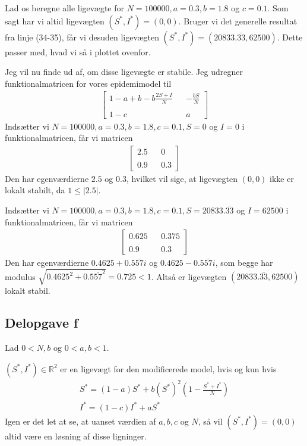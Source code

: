 \documentclass[12pt]{article}
\begin{document}
Lad os beregne alle ligevægte for $N=100000, a=0.3, b=1.8$ og $c=0.1$. Som sagt har vi altid ligevægten $(S^*, I^*)=(0,0)$. Bruger vi det generelle resultat fra linje (34-35), får vi desuden ligevægten $(S^*, I^*)=(20833.\overline{33},62500)$. Dette passer med, hvad vi så i plottet ovenfor.

Jeg vil nu finde ud af, om disse ligevægte er stabile. Jeg udregner funktionalmatricen for vores epidemimodel til
\begin{align}
\begin{bmatrix}
1 - a + b - b\frac{2S + I}{N} && - \frac{bS}{N} \\
\\
1-c && a 
\end{bmatrix}
\end{align}
Indsætter vi $N=100000, a=0.3, b=1.8, c=0.1, S=0$ og $I=0$ i funktionalmatricen, får vi matricen
\begin{align}
\begin{bmatrix}
2.5 && 0 \\
\\
0.9 && 0.3 
\end{bmatrix}
\end{align}
Den har egenværdierne $2.5$ og $0.3$, hvilket vil sige, at ligevægten $(0,0)$ ikke er lokalt stabilt, da $1\leq |2.5|$.

Indsætter vi $N=100000, a=0.3, b=1.8, c=0.1, S=20833.\overline{33}$ og $I=62500$ i funktionalmatricen, får vi matricen
\begin{align}
\begin{bmatrix}
0.625 && 0.375 \\
\\
0.9 && 0.3 
\end{bmatrix}
\end{align}
Den har egenværdierne $0.4625 + 0.5\overline{57}i$ og $0.4625 - 0.5\overline{57}i$, som begge har modulus $\sqrt{0.4625^2 + 0.5\overline{57}^2}=0.725<1$. Altså er ligevægten $(20833.\overline{33}, 62500)$ lokalt stabil.

\subsection{Delopgave f}

Lad $0 < N, b$ og $0 < a,b < 1$. 

$(S^*,I^*)\in \mathbb{R}^2$ er en ligevægt for den modificerede model, hvis og kun hvis
\begin{align}
S^* = (1-a)S^* + b(S^*)^2\left(1 - \frac{S^* + I^*}{N} \right)\\
I^* = (1-c)I^* + aS^*
\end{align}
Igen er det let at se, at uanset værdien af $a, b, c$ og $N$, så vil $(S^*,I^*)=(0,0)$ altid være en løsning af disse ligninger. 
\end{document}
